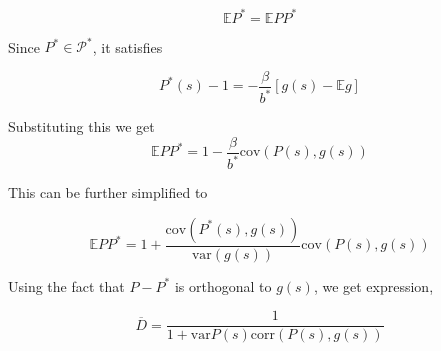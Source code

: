 \documentclass[thmsb,11pt]{article}
\newcommand{\var}{\mathrm{var}}
\newcommand{\cov}{\mathrm{cov}}
\newcommand{\corr}{\mathrm{corr}}
\begin{document}
\[\mathbb{E}P^*=\mathbb{E}P P^*\]

Since $P^*\in \mathcal{P}^*$, it satisfies


\[P^*(s)-1=-\frac{\beta}{b^*}[g(s)-\mathbb{E}g]\]

Substituting this we get 
\[\mathbb{E}P P^*=1-\frac{\beta}{b^*}\cov(P(s),g(s))\]

This can be further simplified to 

\[
\mathbb{E}P P^*=1+\frac{\cov(P^*(s),g(s))}{\var(g(s))}\cov(P(s),g(s))
\]

Using the fact that $P-P^*$ is orthogonal to $g(s)$, we get expression,

\[\overline{D}=\frac{1}{1+\var{P(s)}\corr(P(s),g(s))}\]




\newpage





\newpage
\end{document}
